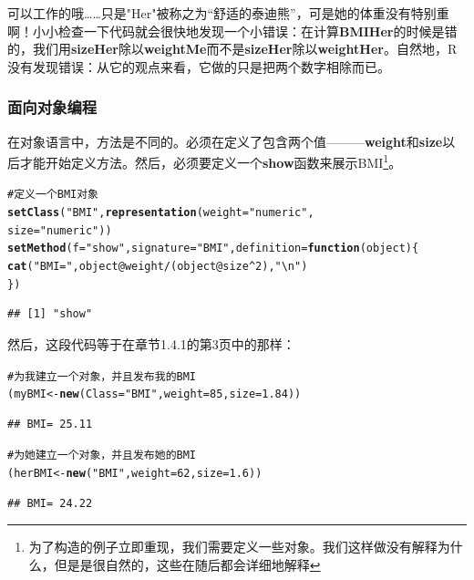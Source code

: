 \documentclass[12pt,a4paper]{article}\usepackage{graphicx, color}
\makeatletter
\newcommand{\hlfunctioncall}[1]{\textcolor[rgb]{0.501960784313725,0,0.329411764705882}{\textbf{#1}}}%
\newcommand{\hlstring}[1]{\textcolor[rgb]{0.6,0.6,1}{#1}}%
\newcommand{\hlcomment}[1]{\textcolor[rgb]{0.180392156862745,0.6,0.341176470588235}{#1}}%
\newenvironment{kframe}{%
 \def\at@end@of@kframe{}%
 \ifinner\ifhmode%
  \def\at@end@of@kframe{\end{minipage}}%
  \begin{minipage}{\columnwidth}%
 \fi\fi%
 \def\FrameCommand##1{\hskip\@totalleftmargin \hskip-\fboxsep
 \colorbox{shadecolor}{##1}\hskip-\fboxsep
     \hskip-\linewidth \hskip-\@totalleftmargin \hskip\columnwidth}%
 \MakeFramed {\advance\hsize-\width
   \@totalleftmargin\z@ \linewidth\hsize
   \@setminipage}}%
 {\par\unskip\endMakeFramed%
 \at@end@of@kframe}
\newenvironment{knitrout}{}{} %
\makeatother
\begin{document}
可以工作的哦……只是"Her"被称之为“舒适的泰迪熊”，可是她的体重没有特别重啊！小小检查一下代码就会很快地发现一个小错误：在计算\textbf{BMIHer}的时候是错的，我们用\textbf{sizeHer}除以\textbf{weightMe}而不是\textbf{sizeHer}除以\textbf{weightHer}。自然地，R没有发现错误：从它的观点来看，它做的只是把两个数字相除而已。

\subsubsection{面向对象编程}
在对象语言中，方法是不同的。必须在定义了包含两个值———\textbf{weight}和\textbf{size}以后才能开始定义方法。然后，必须要定义一个\textbf{show}函数来展示BMI\footnote{为了构造的例子立即重现，我们需要定义一些对象。我们这样做没有解释为什么，但是是很自然的，这些在随后都会详细地解释}。
\begin{knitrout}
\color{fgcolor}\begin{kframe}
\begin{alltt}
\hlcomment{# 定义一个BMI对象}
\hlfunctioncall{setClass}(\hlstring{"BMI"}, \hlfunctioncall{representation}(weight = \hlstring{"numeric"}, 
    size = \hlstring{"numeric"}))
\hlfunctioncall{setMethod}(f = \hlstring{"show"}, signature = \hlstring{"BMI"}, definition = \hlfunctioncall{function}(object) \{
    \hlfunctioncall{cat}(\hlstring{"BMI="}, object@weight/(object@size^2), \hlstring{"\textbackslash{}n"})
\})
\end{alltt}
\begin{verbatim}
## [1] "show"
\end{verbatim}
\end{kframe}
\end{knitrout}

然后，这段代码等于在章节1.4.1的第3页中的那样：
\begin{knitrout}
\color{fgcolor}\begin{kframe}
\begin{alltt}
\hlcomment{# 为我建立一个对象，并且发布我的BMI}
(myBMI <- \hlfunctioncall{new}(Class = \hlstring{"BMI"}, weight = 85, size = 1.84))
\end{alltt}
\begin{verbatim}
## BMI= 25.11
\end{verbatim}
\begin{alltt}
\hlcomment{# 为她建立一个对象，并且发布她的BMI}
(herBMI <- \hlfunctioncall{new}(\hlstring{"BMI"}, weight = 62, size = 1.6))
\end{alltt}
\begin{verbatim}
## BMI= 24.22
\end{verbatim}
\end{kframe}
\end{knitrout}
\end{document}
